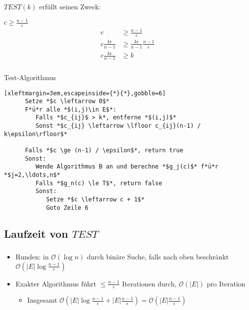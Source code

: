 \documentclass{beamer}
\newcommand{\trianglearrow}{{\tiny\usebeamercolor[bg]{block title} \raisebox{.5ex}{$\blacktriangleright$} }} %
\begin{document}
\begin{frame}
   \frametitle{\insertsection}
   \framesubtitle{\insertsubsection}

   $TEST(k)$ erfüllt seinen Zweck:
   \begin{block}{$c\geq\frac{n-1}{\epsilon}$}
      \begin{align*}
         c & \ge \frac{n-1}{\epsilon} \\
         c \frac{k\epsilon}{n-1} & \ge \frac{k\epsilon}{n-1}\frac{n-1}{\epsilon} \\
         c \frac{k\epsilon}{n-1} & \ge k
      \end{align*}
   \end{block}
\end{frame}

\begin{frame}[fragile]
   \frametitle{\insertsection}
   \framesubtitle{\insertsubsection}
   \begin{block}{Test-Algorithmus}
      \begin{lstlisting}[xleftmargin=3em,escapeinside={*}{*},gobble=6]
      Setze *$c \leftarrow 0$*
      F*ü*r alle *$(i,j)\in E$*:
         Falls *$c_{ij}$ > k*, entferne *$(i,j)$*
         Sonst *$c_{ij} \leftarrow \lfloor c_{ij}(n-1) / k\epsilon\rfloor$*

      Falls *$c \ge (n-1) / \epsilon$*, return true
      Sonst: 
         Wende Algorithmus B an und berechne *$g_j(c)$* f*ü*r *$j=2,\ldots,n$*
         Falls *$g_n(c) \le T$*, return false
         Sonst:
            Setze *$c \leftarrow c + 1$*
            Goto Zeile 6
      \end{lstlisting}
   \end{block}
\end{frame}

\subsection{Laufzeit von $TEST$}

\begin{frame}
   \frametitle{\insertsection}
   \framesubtitle{\insertsubsection}
   \begin{itemize}
      \item Runden: in $\mathcal{O}(\log{n})$ durch binäre Suche, falls nach
         oben beschränkt \trianglearrow $\mathcal{O}\left(|E|\log{\frac{n-1}{\epsilon}}\right)$
      \item Exakter Algorithmus führt $\le \frac{n-1}{\epsilon}$ Iterationen
         durch, $\mathcal{O}\left(|E|\right)$ pro Iteration
         \begin{itemize}
            \item Insgesamt $\mathcal{O}\left(|E|\log{\frac{n-1}{\epsilon}} + |E|\frac{n-1}{\epsilon}\right) = \mathcal{O}\left(|E|\frac{n-1}{\epsilon}\right)$
         \end{itemize}
   \end{itemize}

\end{frame}
\end{document}
